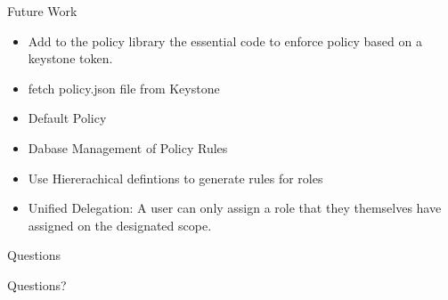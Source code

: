 \documentclass{beamer}
\begin{document}
\begin{frame}{Future Work}
  \begin{itemize}
    \item Add to the policy library the essential code to enforce policy based on a keystone token.
    \item fetch policy.json file from Keystone
    \item Default Policy
    \item Dabase Management of Policy Rules
    \item Use Hiererachical defintions to generate rules for roles
    \item Unified Delegation:  A user can only assign a role that they themselves have assigned on the designated scope.
  \end{itemize}
\end{frame}



\begin{frame}{Questions}
  \begin{center}
    \begin{exampleblock}{}
      Questions?
    \end{exampleblock}
  \end{center}
\end{frame}
\end{document}
